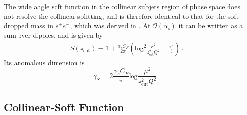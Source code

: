 \documentclass[a4paper,11pt]{article}
\def\log{\text{log}}
\def\zcut{z_{\text{cut}}}
\begin{document}
The wide angle soft function in the collinear subjets region of phase space does not resolve the collinear splitting, and is therefore identical to that for the soft dropped mass in $e^+e^-$, which was derived in \cite{Frye:2016aiz}. At $\mathcal{O}(\alpha_s)$ it can be written as a sum over dipoles, and is given by
\begin{align}
S(\zcut) = 1+\frac{\alpha_s C_F}{2\pi}\left(
\log^2\frac{\mu^2}{\zcut^2 Q^2}-\frac{\pi^2}{6}
\right)\,.
\end{align}
Its anomalous dimension is
\begin{equation}
\gamma_S=2\frac{\alpha_s C_F}{\pi}\log\frac{\mu^2}{\zcut^2 Q^2}\,.
\end{equation}

\subsection{Collinear-Soft Function}
\end{document}
